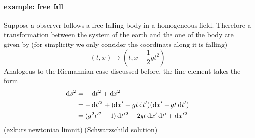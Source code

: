\paragraph{example: free fall}
Suppose a observer follows a free falling body in a homogeneous field. Therefore a transformation between the system of the earth and the one of the body are given by (for simplicity we only consider the coordinate along it is falling)
\begin{equation}
    (t,x)\to\left(t,x-\frac{1}{2}gt^2\right)
\end{equation}
Analogous to the Riemannian case discussed before, the line element takes the form
\begin{align*}
\dif s^2&=-\dif t^2 +\dif x^2\\
&=-\dif t'^2+(\dif x'- gt\dif t')(\dif x'- gt\dif t')\\
&=(g^2t'^2-1)\dif t'^2-2gt\dif x'\dif t'+\dif x'^2\\
\end{align*}
(exkurs newtonian limnit)
(Schwarzschild solution)